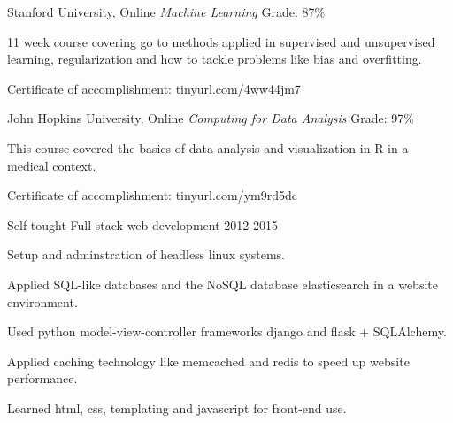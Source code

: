 

\begin{cventries}

\cventry
  {Stanford University, Online} %
  {\textit{Machine Learning}}
  {Grade: 87\%} %
  {} %
  {
    \begin{cvitems} %
      \item {11 week course covering go to methods applied in supervised and unsupervised learning, regularization and how to tackle problems like bias and overfitting.}
      \item {Certificate of accomplishment: tinyurl.com/4ww44jm7}
    \end{cvitems}
  }

\cventry
  {John Hopkins University, Online} %
  {\textit{Computing for Data Analysis}} %
  {Grade: 97\%} %
  {} %
  {
    \begin{cvitems} %
      \item {This course covered the basics of data analysis and visualization in R in a medical context.}
      \item {Certificate of accomplishment: tinyurl.com/ym9rd5dc}
    \end{cvitems}
  }

\cventry
  {Self-tought} %
  {Full stack web development} %
  {2012-2015} %
  {} %
  {
    \begin{cvitems} %
      \item {Setup and adminstration of headless linux systems.}
      \item {Applied SQL-like databases and the NoSQL database elasticsearch in a website environment.}
      \item {Used python model-view-controller frameworks django and flask + SQLAlchemy.}
      \item {Applied caching technology like memcached and redis to speed up website performance.}
      \item {Learned html, css, templating and javascript for front-end use.}
    \end{cvitems}
  }
\end{cventries}
